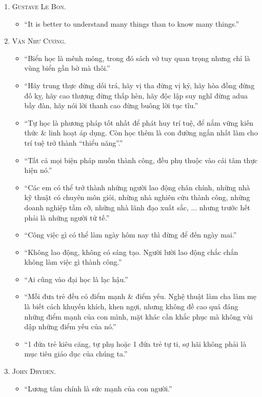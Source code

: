 \documentclass{article}
\begin{document}
\begin{enumerate}
	\item \textsc{Gustave Le Bon.}
	\begin{itemize}
		\item ``It is better to understand many things than to know many things.''
	\end{itemize}
	\item \textsc{Văn Như Cương.}
	\begin{itemize}
		\item ``Biển học là mênh mông, trong đó sách vở tuy quan trọng nhưng chỉ là vùng biển gần bờ mà thôi.''
		\item ``Hãy trung thực đừng dối trá, hãy vị tha đừng vị kỷ, hãy hòa đồng đừng đố kỵ, hãy cao thượng đừng thấp hèn, hãy độc lập suy nghĩ đừng adua bầy đàn, hãy nói lời thanh cao đừng buông lời tục tĩu.''
		\item ``Tự học là phương pháp tốt nhất để phát huy trí tuệ, để nắm vững kiến thức \& linh hoạt áp dụng. Còn học thêm là con đường ngắn nhất làm cho trí tuệ trở thành ``thiểu năng''.''
		\item ``Tất cả mọi biện pháp muốn thành công, đều phụ thuộc vào cái tâm thực hiện nó.''
		\item ``Các em có thể trở thành những người lao động chân chính, những nhà kỹ thuật có chuyên môn giỏi, những nhà nghiên cứu thành công, những doanh nghiệp tầm cỡ, những nhà lãnh đạo xuất sắc, $\ldots$ nhưng trước hết phải là những người tử tế.''
		\item ``Công việc gì có thể làm ngày hôm nay thì đừng để đến ngày mai.''
		\item ``Không lao động, không có sáng tạo. Người lười lao động chắc chắn không làm việc gì thành công.''
		\item ``Ai cũng vào đại học là lạc hậu.''
		\item ``Mỗi đưa trẻ đều có điểm mạnh \& điểm yếu. Nghệ thuật làm cha làm mẹ là biết cách khuyến khích, khen ngợi, nhưng không đề cao quá đáng những điểm mạnh của con mình, mặt khác cần khắc phục mà không vùi dập những điểm yếu của nó.''
		\item ``1 đứa trẻ kiêu căng, tự phụ hoặc 1 đứa trẻ tự ti, sợ hãi không phải là mục tiêu giáo dục của chúng ta.''
	\end{itemize}
	\item \textsc{John Dryden.}
	\begin{itemize}
		\item ``Lương tâm chính là sức mạnh của con người.''
	\end{itemize}

\end{enumerate}
\end{document}
